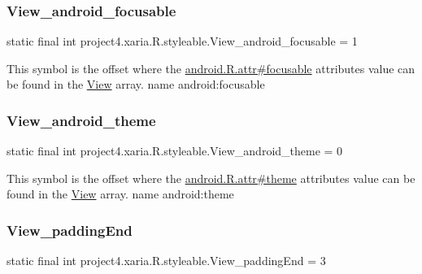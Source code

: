 \subsubsection{\texorpdfstring{View\+\_\+android\+\_\+focusable}{View\_android\_focusable}}
{\footnotesize\ttfamily static final int project4.\+xaria.\+R.\+styleable.\+View\+\_\+android\+\_\+focusable = 1\hspace{0.3cm}{\ttfamily [static]}}

This symbol is the offset where the \hyperlink{}{android.\+R.\+attr\#focusable} attribute\textquotesingle{}s value can be found in the \hyperlink{classproject4_1_1xaria_1_1R_1_1styleable_a26a934fb1a597b7811923bdd4d3d8ecf}{View} array.  name android\+:focusable \mbox{\label{classproject4_1_1xaria_1_1R_1_1styleable_af98caf79414987ddefaf5c9675bb0e64}} 
\subsubsection{\texorpdfstring{View\+\_\+android\+\_\+theme}{View\_android\_theme}}
{\footnotesize\ttfamily static final int project4.\+xaria.\+R.\+styleable.\+View\+\_\+android\+\_\+theme = 0\hspace{0.3cm}{\ttfamily [static]}}

This symbol is the offset where the \hyperlink{}{android.\+R.\+attr\#theme} attribute\textquotesingle{}s value can be found in the \hyperlink{classproject4_1_1xaria_1_1R_1_1styleable_a26a934fb1a597b7811923bdd4d3d8ecf}{View} array.  name android\+:theme \mbox{\label{classproject4_1_1xaria_1_1R_1_1styleable_a5fcfb70d1e2f153ceb31eb7dfb763f57}} 
\subsubsection{\texorpdfstring{View\+\_\+padding\+End}{View\_paddingEnd}}
{\footnotesize\ttfamily static final int project4.\+xaria.\+R.\+styleable.\+View\+\_\+padding\+End = 3\hspace{0.3cm}{\ttfamily [static]}}

